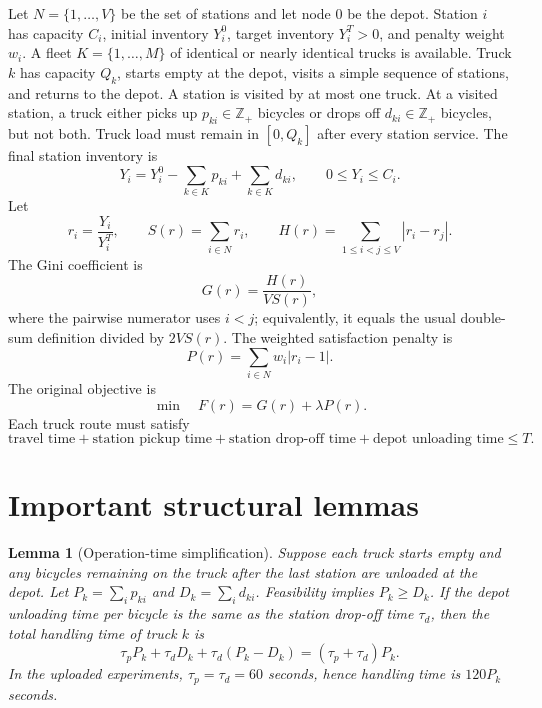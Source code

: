 \documentclass[11pt]{article}
\newtheorem{lemma}{Lemma}
\begin{document}
Let $N=\{1,\ldots,V\}$ be the set of stations and let node $0$ be the depot.  Station $i$ has capacity $C_i$, initial inventory $Y_i^0$, target inventory $Y_i^T>0$, and penalty weight $w_i$.  A fleet $K=\{1,\ldots,M\}$ of identical or nearly identical trucks is available.  Truck $k$ has capacity $Q_k$, starts empty at the depot, visits a simple sequence of stations, and returns to the depot.  A station is visited by at most one truck.  At a visited station, a truck either picks up $p_{ki}\in\mathbb{Z}_+$ bicycles or drops off $d_{ki}\in\mathbb{Z}_+$ bicycles, but not both.  Truck load must remain in $[0,Q_k]$ after every station service.  The final station inventory is
\begin{equation}
    Y_i = Y_i^0 - \sum_{k\in K}p_{ki} + \sum_{k\in K}d_{ki},
    \qquad 0\le Y_i\le C_i.
\end{equation}
Let
\begin{equation}
    r_i = \frac{Y_i}{Y_i^T}, \qquad
    S(r)=\sum_{i\in N} r_i, \qquad
    H(r)=\sum_{1\le i<j\le V}|r_i-r_j|.
\end{equation}
The Gini coefficient is
\begin{equation}
    G(r)=\frac{H(r)}{V S(r)},
\end{equation}
where the pairwise numerator uses $i<j$; equivalently, it equals the usual double-sum definition divided by $2VS(r)$.  The weighted satisfaction penalty is
\begin{equation}
    P(r)=\sum_{i\in N}w_i |r_i-1|.
\end{equation}
The original objective is
\begin{equation}
    \min \quad F(r)=G(r)+\lambda P(r).
\end{equation}
Each truck route must satisfy
\begin{equation}
    \text{travel time} + \text{station pickup time} + \text{station drop-off time} + \text{depot unloading time} \le T.
\end{equation}

\section{Important structural lemmas}

\begin{lemma}[Operation-time simplification]
Suppose each truck starts empty and any bicycles remaining on the truck after the last station are unloaded at the depot.  Let $P_k=\sum_i p_{ki}$ and $D_k=\sum_i d_{ki}$.  Feasibility implies $P_k\ge D_k$.  If the depot unloading time per bicycle is the same as the station drop-off time $\tau_d$, then the total handling time of truck $k$ is
\begin{equation}
    \tau_p P_k + \tau_dD_k + \tau_d(P_k-D_k)
    = (\tau_p+\tau_d)P_k.
\end{equation}
In the uploaded experiments, $\tau_p=\tau_d=60$ seconds, hence handling time is $120P_k$ seconds.
\end{lemma}
\end{document}
